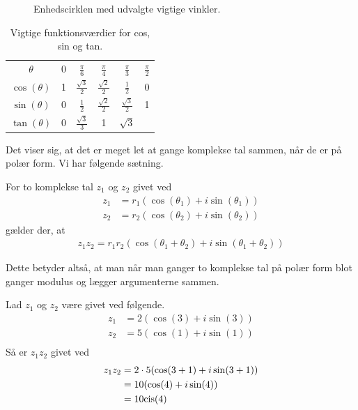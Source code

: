 \begin{figure}[H]
	\caption{Enhedscirklen med udvalgte vigtige vinkler.}
	\label{fig:enhed}
\end{figure}
\begin{table}[H]
	\centering
	\begin{tabular}{cccccc}
		$\theta$ & 0 & $\frac{\pi}{6}$ & $\frac{\pi}{4}$ & $\frac{\pi}{3}$ & $\frac{\pi}{2}$ \\
		$\cos(\theta)$ & 1 &  $\frac{\sqrt{3}}{2}$ & $\frac{\sqrt{2}}{2}$ & $\frac{1}{2}$ & 0 \\
		$\sin(\theta)$ & 0 & $\frac{1}{2}$ & $\frac{\sqrt{2}}{2}$ &  $\frac{\sqrt{3}}{2}$ & 1 \\
		$\tan(\theta)$ & 0 &  $\frac{\sqrt{3}}{3}$ & 1 & $\sqrt{3}$ & 
	\end{tabular}
	\caption{Vigtige funktionsværdier for cos, sin og tan.}
	\label{tab:trig}
\end{table}
\newpage
Det viser sig, at det er meget let at gange komplekse tal sammen, når de er på polær form. Vi har følgende sætning.
\begin{setn}\label{setn:gange}
	For to komplekse tal $z_1$ og $z_2$ givet ved
	\begin{align*}
		z_1 &= r_1(\cos(\theta_1) + i \sin(\theta_1))\\
		z_2 &= r_2(\cos(\theta_2) + i \sin(\theta_2))
	\end{align*}
	gælder der, at 
	\begin{align*}
		z_1z_2 = r_1r_2(\cos(\theta_1 + \theta_2) + i\sin(\theta_1 + \theta_2))
	\end{align*}
\end{setn}
Dette betyder altså, at man når man ganger to komplekse tal på polær form blot ganger modulus og lægger argumenterne sammen. 
\begin{exa}
	Lad $z_1$ og $z_2$ være givet ved følgende.
	\begin{align*}
		z_1 &= 2(\cos(3) + i \sin(3))\\
		z_2 &= 5(\cos(1) + i \sin(1))\\
	\end{align*}
	Så er $z_1z_2$ givet ved
	\begin{align*}
		z_1z_2 &= 2\cdot 5(\cos(3+1) + i \sin(3+1))\\
		 &= 10(\cos(4) + i \sin(4))\\
		 &= 10\textnormal{cis}(4)
	\end{align*}
\end{exa}
